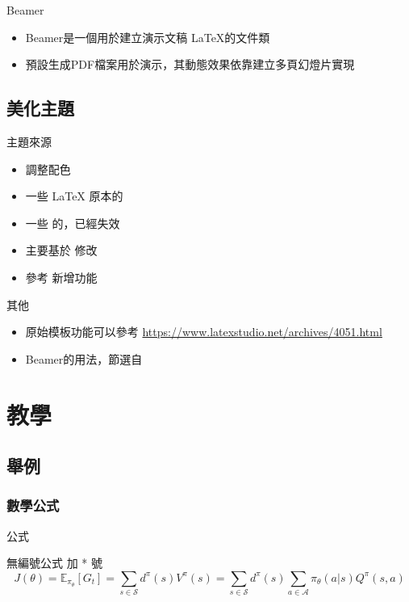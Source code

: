 \documentclass{beamer}
\begin{document}
\begin{frame}{Beamer}
    \begin{itemize}
        \item Beamer是一個用於建立演示文稿 \LaTeX 的文件類
        \item 預設生成PDF檔案用於演示，其動態效果依靠建立多頁幻燈片實現
    \end{itemize}
\end{frame}

\subsection{美化主題}

\begin{frame}{主題來源}
    \begin{itemize}
        \item 調整配色
        \item 一些 \LaTeX{} 原本的
        \item 一些 \href{http://far.tooold.cn/post/latex/beamertsinghua}{\color{deepred}{原始Tsinghua}} \cite{1}的，已經失效
        \item 主要基於 \href{https://www.overleaf.com/latex/templates/thu-beamer-theme/vwnqmzndvwyb}{\color{deepred}{修改版Tsinghua}} \cite{2}修改
        \item 參考 \href{https://github.com/SunYanCN/Latex-Beamer-Template}{\color{deepred}{中文Beamer模板}} \cite{3}新增功能
    \end{itemize}
\end{frame}

\begin{frame}{其他}
    \begin{itemize}
        \item 原始模板功能可以參考
        \url{https://www.latexstudio.net/archives/4051.html}
        \item Beamer的用法，節選自\href{https://stu.cs.tsinghua.edu.cn/~harry/latex-talk.pdf}{\color{deepred}{如何使用LATEX排版论文}}\cite{4}
    \end{itemize}
\end{frame}

\section{教學}
\subsection{舉例}
\subsubsection{數學公式}
\begin{frame}{公式}
    \begin{exampleblock}{無編號公式} %
        加 * 號
        \begin{equation*}
            J(\theta) = \mathbb{E}_{\pi_\theta}[G_t] = \sum_{s\in\mathcal{S}} d^\pi (s)V^\pi(s)=\sum_{s\in\mathcal{S}} d^\pi(s)\sum_{a\in\mathcal{A}}\pi_\theta(a|s)Q^\pi(s,a)
        \end{equation*}
    \end{exampleblock}
\end{frame}
\end{document}
